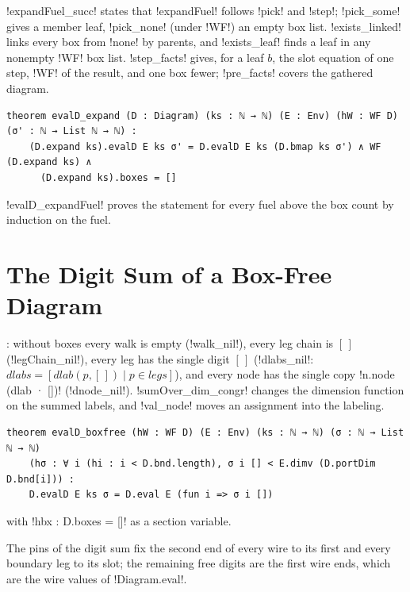 {\lbx!expandFuel_succ! states that \lbx!expandFuel! follows \lbx!pick! and \lbx!step!; \lbx!pick_some! gives a member leaf, \lbx!pick_none! (under \lbx!WF!) an empty box list. \lbx!exists_linked! links every box from \lbx!none! by parents, and \lbx!exists_leaf! finds a leaf in any nonempty \lbx!WF! box list. \lbx!step_facts! gives, for a leaf $b$, the slot equation of one step, \lbx!WF! of the result, and one box fewer; \lbx!pre_facts! covers the gathered diagram.

\begin{theorem}[Expansion]\label{thm:boxes-evalD-expand}
\begin{lstlisting}[style=leanbox]
theorem evalD_expand (D : Diagram) (ks : ℕ → ℕ) (E : Env) (hW : WF D) (σ' : ℕ → List ℕ → ℕ) :
    (D.expand ks).evalD E ks σ' = D.evalD E ks (D.bmap ks σ') ∧ WF (D.expand ks) ∧
      (D.expand ks).boxes = []
\end{lstlisting}
\end{theorem}
\noindent \lbx!evalD_expandFuel! proves the statement for every fuel above the box count by induction on the fuel.

\section{The Digit Sum of a Box-Free Diagram}\label{sec:boxes-boxfree}

: without boxes every walk is empty (\lbx!walk_nil!), every leg chain is $[\,]$ (\lbx!legChain_nil!), every leg has the single digit $[\,]$ (\lbx!dlabs_nil!: $\mathit{dlabs}=[\mathit{dlab}(p,[\,])\mid p\in\mathit{legs}]$), and every node has the single copy \lbx!n.node (dlab · [])! (\lbx!dnode_nil!). \lbx!sumOver_dim_congr! changes the dimension function on the summed labels, and \lbx!val_node! moves an assignment into the labeling.

\begin{theorem}\label{thm:boxes-boxfree}
\begin{lstlisting}[style=leanbox]
theorem evalD_boxfree (hW : WF D) (E : Env) (ks : ℕ → ℕ) (σ : ℕ → List ℕ → ℕ)
    (hσ : ∀ i (hi : i < D.bnd.length), σ i [] < E.dimv (D.portDim D.bnd[i])) :
    D.evalD E ks σ = D.eval E (fun i => σ i [])
\end{lstlisting}
with \lbx!hbx : D.boxes = []! as a section variable.
\end{theorem}
\noindent The pins of the digit sum fix the second end of every wire to its first and every boundary leg to its slot; the remaining free digits are the first wire ends, which are the wire values of \lbx!Diagram.eval!.

}
